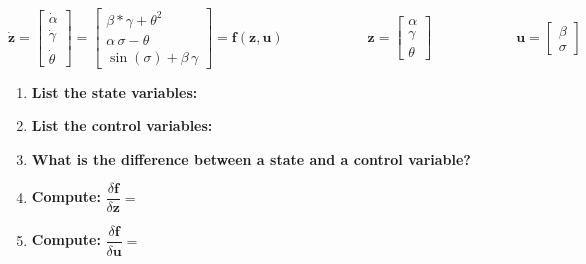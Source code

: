 \begin{equation*}

  \dot{\bm{z}} =

  \begin{bmatrix}
    \dot{\alpha}  \\
    \dot{\gamma}  \\
    \dot{\theta}
  \end{bmatrix}

  =

  \begin{bmatrix}
    \beta * \gamma + \theta^2 \\
    \alpha \, \sigma  - \theta\\
    \sin(\sigma) + \beta \, \gamma
  \end{bmatrix}

  = \bm{f}(\bm{z}, \bm{u})

  \quad \quad \quad \quad \quad \quad

  \bm{z} =
  \begin{bmatrix}
    \alpha \\
    \gamma \\
    \theta
  \end{bmatrix}

\quad \quad \quad \quad \quad \quad

  \bm{u} =
  \begin{bmatrix}
    \beta \\
    \sigma
  \end{bmatrix}


\end{equation*}



\vspace{0.5em}
\begin{enumerate}
  \item \textbf{List the state variables: }
  \vspace{0.6em}
  \item \textbf{List the control variables: }
  \vspace{0.6em}
  \item \textbf{What is the difference between a state and a control variable? }
  \vspace{4em}
  \item \textbf{Compute: } $\dfrac{\delta \bm{f}}{\delta \bm{z}} = $
  \vspace{15em}
  \item \textbf{Compute: } $\dfrac{\delta \bm{f}}{\delta \bm{u}} = $
  \vspace{15em}
\end{enumerate}



